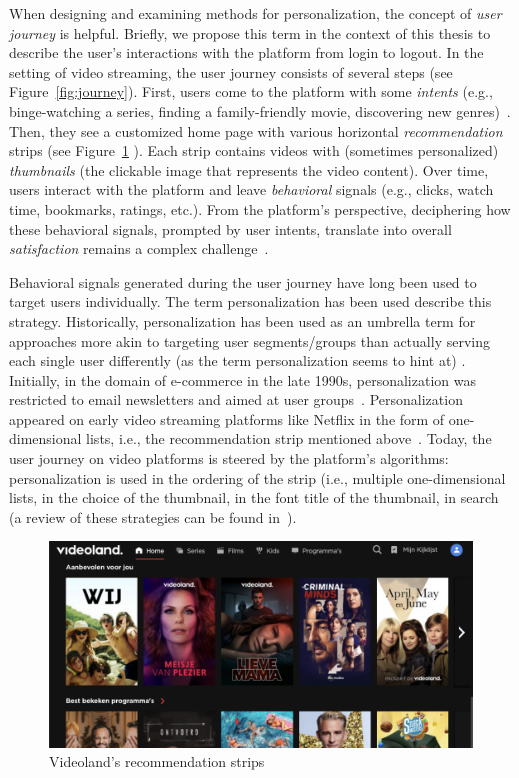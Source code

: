 When designing and examining methods for personalization, the concept of \emph{user journey} is helpful. 
Briefly, we propose this term in the context of this thesis to describe the user's interactions with the platform from login to logout.
In the setting of video streaming, the user journey consists of several steps (see Figure~\ref{fig:journey}).
First, users come to the platform with some \emph{intents} (e.g., binge-watching a series, finding a family-friendly movie, discovering new genres)~\cite{intent}. 
Then, they see a customized home page with various horizontal \emph{recommendation} strips (see Figure~\ref{fig:VLStrip} ). 
Each strip contains videos with (sometimes personalized) \emph{thumbnails} (the clickable image that represents the video content). 
Over time, users interact with the platform and leave \emph{behavioral} signals (e.g., clicks, watch time, bookmarks, ratings, etc.). 
From the platform's perspective, deciphering how these behavioral signals, prompted by user intents, translate into overall \emph{satisfaction} remains a complex challenge~\cite{spotifyIntent}.

Behavioral signals generated during the user journey have long been used to target users individually. 
The term personalization has been used describe this strategy. 
Historically, personalization has been used as an umbrella term for approaches more akin to targeting user segments/groups than actually serving each single user differently (as the term personalization seems to hint at) . 
Initially, in the domain of e-commerce in the late 1990s, personalization was restricted to email newsletters and aimed at user groups~\cite{oldReco}. 
Personalization appeared on early video streaming platforms like Netflix in the form of one-dimensional lists, i.e.,  the recommendation strip mentioned above~\cite{oldReco}. 
Today, the user journey on video platforms is steered by the platform's algorithms: personalization is used in the ordering of the strip (i.e., multiple one-dimensional lists, in the choice of the thumbnail, in the font title of the thumbnail, in search (a review of these strategies can be found in~\cite{NetflixReco}).

\begin{figure}[h]
  \centering
  \includegraphics[width=\textwidth]{images/VLHome_cropped.png}
  \caption{Videoland's recommendation strips}
  \label{fig:VLStrip}
\end{figure}

